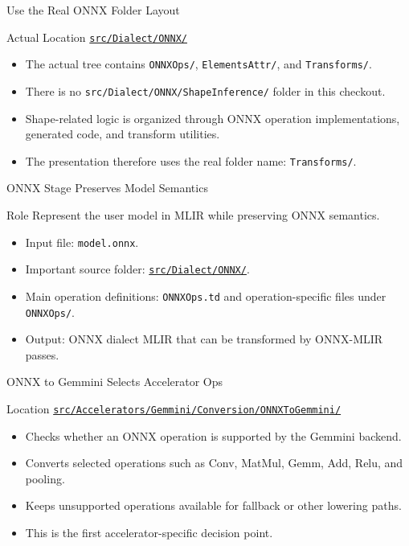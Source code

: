 \documentclass[aspectratio=169,10pt]{beamer}
\newcommand{\code}[1]{\texttt{\footnotesize #1}}
\newcommand{\repoRoot}{/home/lahcen/toolchains/onnx-mlir-xcompile/onnx-mlir}
\newcommand{\pathcode}[1]{\href{run:\repoRoot/#1}{\texttt{\scriptsize #1}}}
\begin{document}
\begin{frame}{Use the Real ONNX Folder Layout}
  \begin{block}{Actual Location}
    \pathcode{src/Dialect/ONNX/}
  \end{block}
  \begin{itemize}
    \item The actual tree contains \code{ONNXOps/}, \code{ElementsAttr/}, and \code{Transforms/}.
    \item There is no \code{src/Dialect/ONNX/ShapeInference/} folder in this checkout.
    \item Shape-related logic is organized through ONNX operation implementations, generated code, and transform utilities.
    \item The presentation therefore uses the real folder name: \code{Transforms/}.
  \end{itemize}
\end{frame}

\begin{frame}{ONNX Stage Preserves Model Semantics}
  \begin{block}{Role}
    Represent the user model in MLIR while preserving ONNX semantics.
  \end{block}
  \begin{itemize}
    \item Input file: \code{model.onnx}.
    \item Important source folder: \pathcode{src/Dialect/ONNX/}.
    \item Main operation definitions: \code{ONNXOps.td} and operation-specific files under \code{ONNXOps/}.
    \item Output: ONNX dialect MLIR that can be transformed by ONNX-MLIR passes.
  \end{itemize}
\end{frame}

\begin{frame}{ONNX to Gemmini Selects Accelerator Ops}
  \begin{block}{Location}
    \pathcode{src/Accelerators/Gemmini/Conversion/ONNXToGemmini/}
  \end{block}
  \begin{itemize}
    \item Checks whether an ONNX operation is supported by the Gemmini backend.
    \item Converts selected operations such as Conv, MatMul, Gemm, Add, Relu, and pooling.
    \item Keeps unsupported operations available for fallback or other lowering paths.
    \item This is the first accelerator-specific decision point.
  \end{itemize}
\end{frame}
\end{document}
